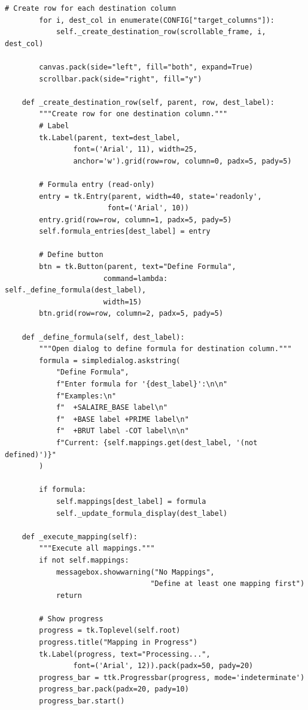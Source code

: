 \begin{lstlisting}[style=pythonstyle]
        # Create row for each destination column
        for i, dest_col in enumerate(CONFIG["target_columns"]):
            self._create_destination_row(scrollable_frame, i, dest_col)
        
        canvas.pack(side="left", fill="both", expand=True)
        scrollbar.pack(side="right", fill="y")
    
    def _create_destination_row(self, parent, row, dest_label):
        """Create row for one destination column."""
        # Label
        tk.Label(parent, text=dest_label,
                font=('Arial', 11), width=25,
                anchor='w').grid(row=row, column=0, padx=5, pady=5)
        
        # Formula entry (read-only)
        entry = tk.Entry(parent, width=40, state='readonly',
                        font=('Arial', 10))
        entry.grid(row=row, column=1, padx=5, pady=5)
        self.formula_entries[dest_label] = entry
        
        # Define button
        btn = tk.Button(parent, text="Define Formula",
                       command=lambda: self._define_formula(dest_label),
                       width=15)
        btn.grid(row=row, column=2, padx=5, pady=5)
    
    def _define_formula(self, dest_label):
        """Open dialog to define formula for destination column."""
        formula = simpledialog.askstring(
            "Define Formula",
            f"Enter formula for '{dest_label}':\n\n"
            f"Examples:\n"
            f"  +SALAIRE_BASE label\n"
            f"  +BASE label +PRIME label\n"
            f"  +BRUT label -COT label\n\n"
            f"Current: {self.mappings.get(dest_label, '(not defined)')}"
        )
        
        if formula:
            self.mappings[dest_label] = formula
            self._update_formula_display(dest_label)
    
    def _execute_mapping(self):
        """Execute all mappings."""
        if not self.mappings:
            messagebox.showwarning("No Mappings",
                                  "Define at least one mapping first")
            return
        
        # Show progress
        progress = tk.Toplevel(self.root)
        progress.title("Mapping in Progress")
        tk.Label(progress, text="Processing...",
                font=('Arial', 12)).pack(padx=50, pady=20)
        progress_bar = ttk.Progressbar(progress, mode='indeterminate')
        progress_bar.pack(padx=20, pady=10)
        progress_bar.start()
        

\end{lstlisting}
